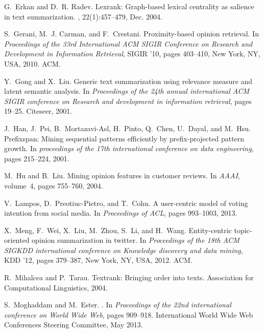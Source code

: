 \documentclass{llncs}
\begin{document}
\begin{thebibliography}{10}

G.~Erkan and D.~R. Radev.
\newblock Lexrank: Graph-based lexical centrality as salience in text
  summarization.
, 22(1):457--479, Dec. 2004.

S.~Gerani, M.~J. Carman, and F.~Crestani.
\newblock Proximity-based opinion retrieval.
\newblock In {\em Proceedings of the 33rd International ACM SIGIR Conference on
  Research and Development in Information Retrieval}, SIGIR '10, pages
  403--410, New York, NY, USA, 2010. ACM.

Y.~Gong and X.~Liu.
\newblock Generic text summarization using relevance measure and latent
  semantic analysis.
\newblock In {\em Proceedings of the 24th annual international ACM SIGIR
  conference on Research and development in information retrieval}, pages
  19--25. Citeseer, 2001.

J.~Han, J.~Pei, B.~Mortazavi-Asl, H.~Pinto, Q.~Chen, U.~Dayal, and M.~Hsu.
\newblock Prefixspan: Mining sequential patterns efficiently by
  prefix-projected pattern growth.
\newblock In {\em proceedings of the 17th international conference on data
  engineering}, pages 215--224, 2001.

M.~Hu and B.~Liu.
\newblock Mining opinion features in customer reviews.
\newblock In {\em AAAI}, volume~4, pages 755--760, 2004.

V.~Lampos, D.~Preotiuc-Pietro, and T.~Cohn.
\newblock A user-centric model of voting intention from social media.
\newblock In {\em Proceedings of ACL}, pages 993--1003, 2013.

X.~Meng, F.~Wei, X.~Liu, M.~Zhou, S.~Li, and H.~Wang.
\newblock Entity-centric topic-oriented opinion summarization in twitter.
\newblock In {\em Proceedings of the 18th ACM SIGKDD international conference
  on Knowledge discovery and data mining}, KDD '12, pages 379--387, New York,
  NY, USA, 2012. ACM.

R.~Mihalcea and P.~Tarau.
\newblock Textrank: Bringing order into texts.
\newblock Association for Computational Linguistics, 2004.

S.~Moghaddam and M.~Ester.
.
\newblock In {\em Proceedings of the 22nd international conference on World
  Wide Web}, pages 909--918. International World Wide Web Conferences Steering
  Committee, May 2013.


\end{thebibliography}
\end{document}
